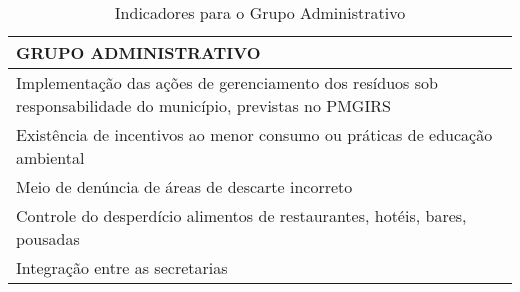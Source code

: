 \begin{table}[h!]
  \centering
  \caption{Indicadores para o Grupo Administrativo}
    \begin{tabular}{|p{27.145em}|}
    \toprule
    \rowcolor[rgb]{ .867,  .922,  .969}  GRUPO ADMINISTRATIVO  \\
    \midrule
    Implementação das ações de gerenciamento dos resíduos sob responsabilidade do município, previstas no PMGIRS \\
    \midrule
    Existência de incentivos ao menor consumo ou práticas de educação ambiental \\
    \midrule
    Meio de denúncia de áreas de descarte incorreto \\
    \midrule
    Controle do desperdício alimentos de restaurantes, hotéis, bares, pousadas \\
    \midrule
    Integração entre as secretarias \\
    \bottomrule
    \end{tabular}%
  \label{tab:ind_adm}%
\end{table}%
